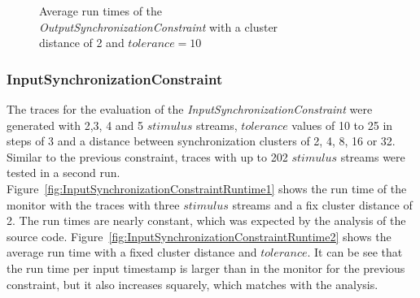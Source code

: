 \begin{figure}
\begin{minipage}{0.45\textwidth}
		\centering
		\caption{Average run times of the\\ \textit{OutputSynchronizationConstraint} with a cluster\\ distance of 2 and $tolerance=10$}
		\label{fig:OutputSynchronizationConstraintRuntime2}
	\end{minipage}\hfill
\end{figure}


\subsubsection{InputSynchronizationConstraint}
The traces for the evaluation of the \textit{InputSynchronizationConstraint} were generated with 2,3, 4 and 5 $stimulus$ streams, $tolerance$ values of 10 to 25 in steps of 3 and a distance between synchronization clusters of 2, 4, 8, 16 or 32. Similar to the previous constraint, traces with up to 202 $stimulus$ streams were tested in a second run.\\
Figure~\ref{fig:InputSynchronizationConstraintRuntime1} shows the run time of the monitor with the traces with three $stimulus$ streams and a fix cluster distance of 2. The run times are nearly constant, which was expected by the analysis of the source code. Figure~\ref{fig:InputSynchronizationConstraintRuntime2} shows the average run time with a fixed cluster distance and $tolerance$. It can be see that the run time per input timestamp is larger than in the monitor for the previous constraint, but it also increases squarely, which matches with the analysis.

